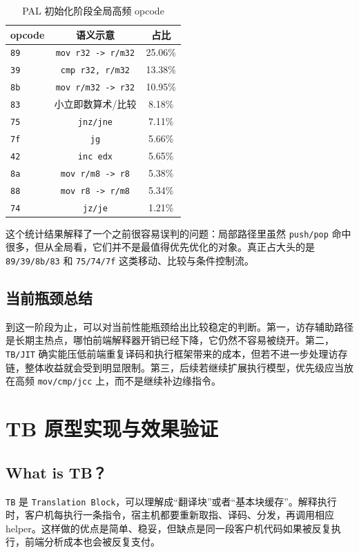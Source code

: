 \documentclass[a4paper]{article}
\begin{document}
\begin{table}[H]
  \centering
  \begin{tabular}{lcc}
    \toprule
    opcode & 语义示意 & 占比 \\
    \midrule
    \texttt{89} & \texttt{mov r32 -> r/m32} & 25.06\% \\
    \texttt{39} & \texttt{cmp r32, r/m32} & 13.38\% \\
    \texttt{8b} & \texttt{mov r/m32 -> r32} & 10.95\% \\
    \texttt{83} & 小立即数算术/比较 & 8.18\% \\
    \texttt{75} & \texttt{jnz/jne} & 7.11\% \\
    \texttt{7f} & \texttt{jg} & 5.66\% \\
    \texttt{42} & \texttt{inc edx} & 5.65\% \\
    \texttt{8a} & \texttt{mov r/m8 -> r8} & 5.38\% \\
    \texttt{88} & \texttt{mov r8 -> r/m8} & 5.34\% \\
    \texttt{74} & \texttt{jz/je} & 1.21\% \\
    \bottomrule
  \end{tabular}
  \caption{PAL 初始化阶段全局高频 opcode}
\end{table}

这个统计结果解释了一个之前很容易误判的问题：局部路径里虽然 \texttt{push/pop} 命中很多，但从全局看，它们并不是最值得优先优化的对象。真正占大头的是 \texttt{89/39/8b/83} 和 \texttt{75/74/7f} 这类移动、比较与条件控制流。

\subsection{当前瓶颈总结}
到这一阶段为止，可以对当前性能瓶颈给出比较稳定的判断。第一，访存辅助路径是长期主热点，哪怕前端解释器开销已经下降，它仍然不容易被绕开。第二，\texttt{TB/JIT} 确实能压低前端重复译码和执行框架带来的成本，但若不进一步处理访存链，整体收益就会受到明显限制。第三，后续若继续扩展执行模型，优先级应当放在高频 \texttt{mov/cmp/jcc} 上，而不是继续补边缘指令。

\section{TB 原型实现与效果验证}

\subsection{What is TB？}
\texttt{TB} 是 \texttt{Translation Block}，可以理解成“翻译块”或者“基本块缓存”。解释执行时，客户机每执行一条指令，宿主机都要重新取指、译码、分发，再调用相应 helper。这样做的优点是简单、稳妥，但缺点是同一段客户机代码如果被反复执行，前端分析成本也会被反复支付。
\end{document}

